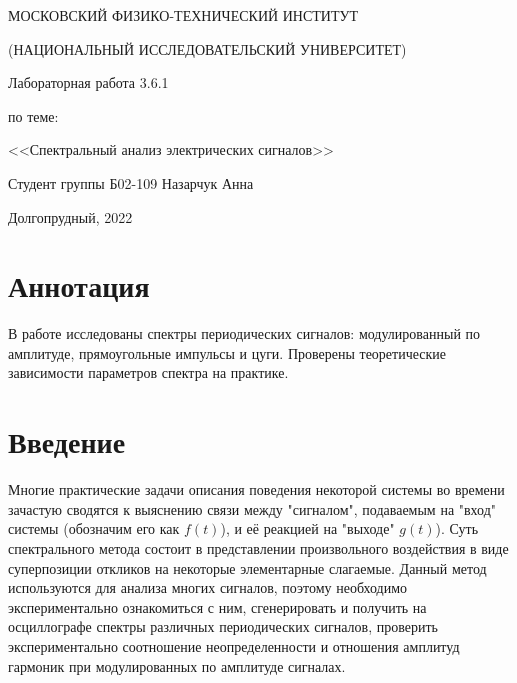 \documentclass[a4paper,12pt]{article} %
\begin{document}
\begin{titlepage}

\thispagestyle{empty}

\centerline{МОСКОВСКИЙ ФИЗИКО-ТЕХНИЧЕСКИЙ ИНСТИТУТ}
\centerline{(НАЦИОНАЛЬНЫЙ ИССЛЕДОВАТЕЛЬСКИЙ УНИВЕРСИТЕТ)}

\vfill

\centerline{\huge{Лабораторная работа 3.6.1}}
\centerline{\large{по теме:}}
\centerline{\LARGE{<<Спектральный анализ электрических сигналов>>}}

\vfill

Студент группы Б02-109 \hfill Назарчук Анна

\vfill

\centerline{Долгопрудный, 2022}
\clearpage
\end{titlepage} 
\section{Аннотация}
В работе исследованы спектры периодических сигналов: модулированный по амплитуде, прямоугольные импульсы и цуги. Проверены теоретические зависимости параметров спектра на практике.


\section{Введение}
Многие практические задачи описания поведения некоторой системы во времени зачастую сводятся к выяснению связи между "сигналом", подаваемым на "вход"
системы (обозначим его как $f(t)$), и её реакцией на "выходе" $g(t)$). Суть спектрального метода состоит в представлении произвольного воздействия в виде суперпозиции откликов на некоторые элементарные слагаемые. Данный метод используются для анализа многих сигналов, поэтому необходимо экспериментально ознакомиться с ним, сгенерировать и получить на осциллографе спектры различных периодических сигналов, проверить экспериментально соотношение неопределенности и отношения амплитуд гармоник при модулированных по амплитуде сигналах.
\end{document}
